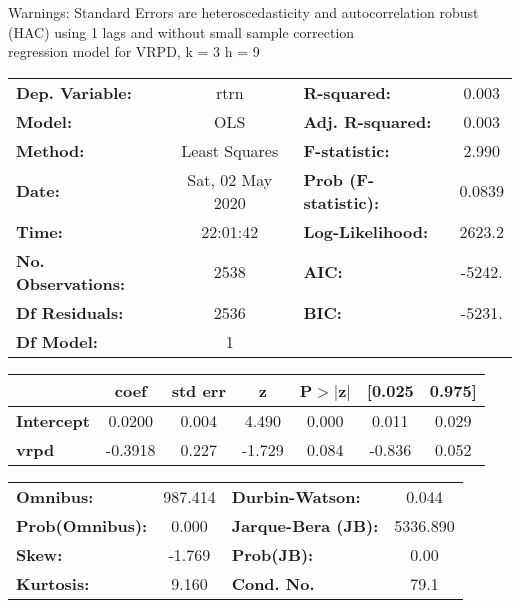 Warnings: \newline
 [1] Standard Errors are heteroscedasticity and autocorrelation robust (HAC) using 1 lags and without small sample correction\\ 

regression model for VRPD, k = 3 h = 9\begin{center}
\begin{tabular}{lclc}
\toprule
\textbf{Dep. Variable:}    &       rtrn       & \textbf{  R-squared:         } &     0.003   \\
\textbf{Model:}            &       OLS        & \textbf{  Adj. R-squared:    } &     0.003   \\
\textbf{Method:}           &  Least Squares   & \textbf{  F-statistic:       } &     2.990   \\
\textbf{Date:}             & Sat, 02 May 2020 & \textbf{  Prob (F-statistic):} &   0.0839    \\
\textbf{Time:}             &     22:01:42     & \textbf{  Log-Likelihood:    } &    2623.2   \\
\textbf{No. Observations:} &        2538      & \textbf{  AIC:               } &    -5242.   \\
\textbf{Df Residuals:}     &        2536      & \textbf{  BIC:               } &    -5231.   \\
\textbf{Df Model:}         &           1      & \textbf{                     } &             \\
\bottomrule
\end{tabular}
\begin{tabular}{lcccccc}
                   & \textbf{coef} & \textbf{std err} & \textbf{z} & \textbf{P$> |$z$|$} & \textbf{[0.025} & \textbf{0.975]}  \\
\midrule
\textbf{Intercept} &       0.0200  &        0.004     &     4.490  &         0.000        &        0.011    &        0.029     \\
\textbf{vrpd}      &      -0.3918  &        0.227     &    -1.729  &         0.084        &       -0.836    &        0.052     \\
\bottomrule
\end{tabular}
\begin{tabular}{lclc}
\textbf{Omnibus:}       & 987.414 & \textbf{  Durbin-Watson:     } &    0.044  \\
\textbf{Prob(Omnibus):} &   0.000 & \textbf{  Jarque-Bera (JB):  } & 5336.890  \\
\textbf{Skew:}          &  -1.769 & \textbf{  Prob(JB):          } &     0.00  \\
\textbf{Kurtosis:}      &   9.160 & \textbf{  Cond. No.          } &     79.1  \\
\bottomrule
\end{tabular}
\end{center}

